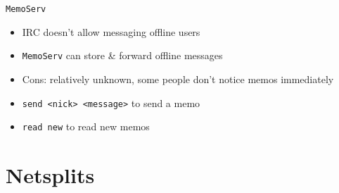 \documentclass{beamer}
\begin{document}
\begin{frame}{\texttt{MemoServ}}
\begin{itemize}
	\item IRC doesn't allow messaging offline users
	\item \texttt{MemoServ} can store \& forward offline messages
	\item Cons: relatively unknown, some people don't notice memos immediately
	\item \texttt{send <nick> <message>} to send a memo
	\item \texttt{read new} to read new memos
\end{itemize}
\end{frame}

\section{Netsplits}
\end{document}
